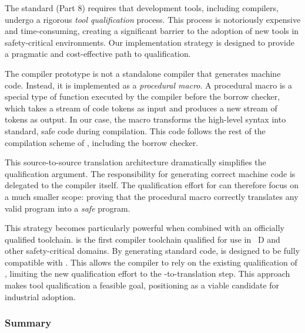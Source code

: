 The \iso standard (Part 8) requires that development tools, including compilers, undergo a rigorous
\emph{tool qualification} process. This process is notoriously expensive and time-consuming,
creating a significant barrier to the adoption of new tools in safety-critical environments. Our
implementation strategy is designed to provide a pragmatic and cost-effective path to qualification.

The \GRust compiler prototype is not a standalone compiler that generates machine code. Instead,
it is implemented as a \Rust \emph{procedural macro}. A procedural macro is a special type of
function executed by the compiler before the borrow checker, which takes a stream of code tokens as
input and produces a new stream of tokens as output. In our case, the macro transforms the
high-level \GRust syntax into standard, safe \Rust code during compilation. This code follows the
rest of the compilation scheme of \Rust, including the borrow checker.

This source-to-source translation architecture dramatically simplifies the qualification argument.
The responsibility for generating correct machine code is delegated to the \Rust compiler itself.
The qualification effort for \GRust can therefore focus on a much smaller scope: proving that the
procedural macro correctly translates any valid \GRust program into a \emph{safe} \Rust program.

This strategy becomes particularly powerful when combined with an officially qualified \Rust
toolchain. \ferrocene is the first \Rust compiler toolchain qualified for use in \iso \Asil~D and
other safety-critical domains. By generating standard \Rust code, \GRust is designed to be fully
compatible with \ferrocene. This allows the \GRust compiler to rely on the existing qualification of
\ferrocene, limiting the new qualification effort to the \GRust-to-\Rust translation step. This
approach makes tool qualification a feasible goal, positioning \GRust as a viable candidate for
industrial adoption.

\subsubsection{Summary}
\label{sec:grust:implem:design_principles:summary}

